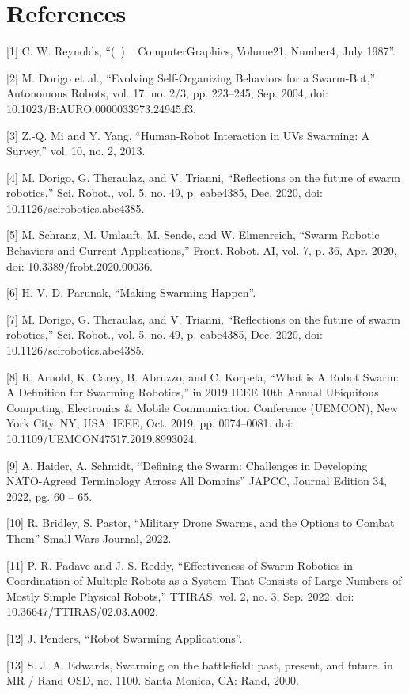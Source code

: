 \section*{References}
[1] C. W. Reynolds, “(~) ~ ComputerGraphics, Volume21, Number4, July 1987”.


[2] M. Dorigo et al., “Evolving Self-Organizing Behaviors for a Swarm-Bot,” Autonomous Robots, vol. 17, no. 2/3, pp. 223–245, Sep. 2004, doi: 
10.1023/B:AURO.0000033973.24945.f3.


[3] Z.-Q. Mi and Y. Yang, “Human-Robot Interaction in UVs Swarming: A Survey,” vol. 10, no. 2, 2013.


[4] M. Dorigo, G. Theraulaz, and V. Trianni, “Reflections on the future of swarm robotics,” Sci. Robot., vol. 5, no. 49, p. eabe4385, Dec. 2020, doi: 10.1126/scirobotics.abe4385.


[5] M. Schranz, M. Umlauft, M. Sende, and W. Elmenreich, “Swarm Robotic Behaviors and Current Applications,” Front. Robot. AI, vol. 7, p. 36, Apr. 2020, doi: 10.3389/frobt.2020.00036.


[6] H. V. D. Parunak, “Making Swarming Happen”.


[7] M. Dorigo, G. Theraulaz, and V. Trianni, “Reflections on the future of swarm robotics,” Sci. Robot., vol. 5, no. 49, p. eabe4385, Dec. 2020, doi: 10.1126/scirobotics.abe4385.


[8] R. Arnold, K. Carey, B. Abruzzo, and C. Korpela, “What is A Robot Swarm: A Definition for Swarming Robotics,” in 2019 IEEE 10th Annual Ubiquitous Computing, Electronics & Mobile Communication Conference (UEMCON), New York City, NY, USA: IEEE, Oct. 2019, pp. 0074–0081. doi: 10.1109/UEMCON47517.2019.8993024.


[9] A. Haider, A. Schmidt, “Defining the Swarm: Challenges in Developing NATO-Agreed Terminology Across All Domains” JAPCC, Journal Edition 34, 2022, pg. 60 – 65.


[10] R. Bridley, S. Pastor, “Military Drone Swarms, and the Options to Combat Them” Small Wars Journal, 2022.


[11] P. R. Padave and J. S. Reddy, “Effectiveness of Swarm Robotics in Coordination of Multiple Robots as a System That Consists of Large Numbers of Mostly Simple Physical Robots,” TTIRAS, vol. 2, no. 3, Sep. 2022, doi: 10.36647/TTIRAS/02.03.A002.


[12] J. Penders, “Robot Swarming Applications”.


[13] S. J. A. Edwards, Swarming on the battlefield: past, present, and future. in MR / Rand OSD, no. 1100. Santa Monica, CA: Rand, 2000.


